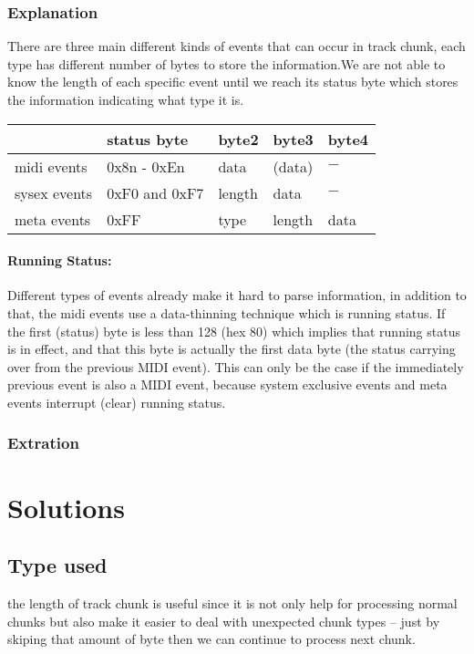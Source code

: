 \documentclass[12.5pt]{scrartcl}
\begin{document}
\subsubsection{Explanation}
There are three main different kinds of events that can occur in track chunk, each type has different number of bytes to store the information.We are not able to know the length of each specific event until we reach its status byte which stores the information indicating what type it is.
\begin{center}
	\begin{tabu}{|l|m{7em}|m{4em}|m{4em}|m{4em}|}
	    \hline
	    & status byte & byte2 & byte3 & byte4 \\
        \hline
		midi events & 0x8n - 0xEn & data & (data) & $-$\\ 
		\hline
		sysex events & 0xF0 and 0xF7 & length & data & $-$\\  
		\hline
		meta events & 0xFF & type & length & data \\  
		\hline
	\end{tabu}
\end{center}
\paragraph{Running Status: }
Different types of events already make it hard to parse information, in addition to that, the midi events use  a data-thinning technique which is running status.
If the first (status) byte is less than 128 (hex 80) which implies that running status is in effect, and that this byte is actually the first data byte (the status carrying over from the previous MIDI event). This can only be the case if the immediately previous event is also a MIDI event, because system exclusive events and meta events interrupt (clear) running status.

\subsubsection{Extration}

\section{Solutions}
\subsection{Type used}
the length of track chunk is useful since it is not only help for processing normal chunks but also make it easier to deal with unexpected chunk types -- just by skiping that amount of byte then we can continue to process next chunk.
\end{document}
